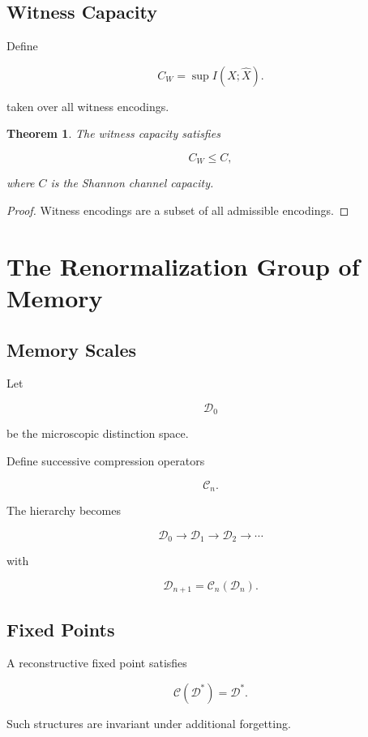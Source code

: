 \documentclass[12pt,oneside]{book}
\theoremstyle{plain} \newtheorem{theorem}{Theorem}[chapter] \newtheorem{lemma}[theorem]{Lemma} \newtheorem{proposition}[theorem]{Proposition} \newtheorem{corollary}[theorem]{Corollary}
\theoremstyle{definition} \newtheorem{definition}[theorem]{Definition} \newtheorem{axiom}[theorem]{Axiom} \newtheorem{construction}[theorem]{Construction}
\theoremstyle{remark} \newtheorem{remark}[theorem]{Remark} \newtheorem{example}[theorem]{Example}
\newcommand{\D}{\mathcal{D}} \newcommand{\R}{\mathcal{R}} \newcommand{\F}{\mathcal{F}} \newcommand{\U}{\mathcal{U}} \newcommand{\M}{\mathcal{M}} \newcommand{\G}{\Gamma}
\begin{document}
\section{Witness Capacity}

Define

\[
C_W
=
\sup I(X;\hat X).
\]

taken over all witness encodings.

\begin{theorem}

The witness capacity satisfies

\[
C_W
\leq
C,
\]

where $C$ is the Shannon channel capacity.

\end{theorem}

\begin{proof}

Witness encodings are a subset of all admissible encodings.

\end{proof}

\chapter{The Renormalization Group of Memory}

\section{Memory Scales}

Let

\[
\D_0
\]

be the microscopic distinction space.

Define successive compression operators

\[
\mathcal C_n.
\]

The hierarchy becomes

\[
\D_0
\rightarrow
\D_1
\rightarrow
\D_2
\rightarrow
\cdots
\]

with

\[
\D_{n+1}
=
\mathcal C_n(\D_n).
\]

\section{Fixed Points}

A reconstructive fixed point satisfies

\[
\mathcal C(\D^*)
=
\D^*.
\]

Such structures are invariant under additional forgetting.
\end{document}
